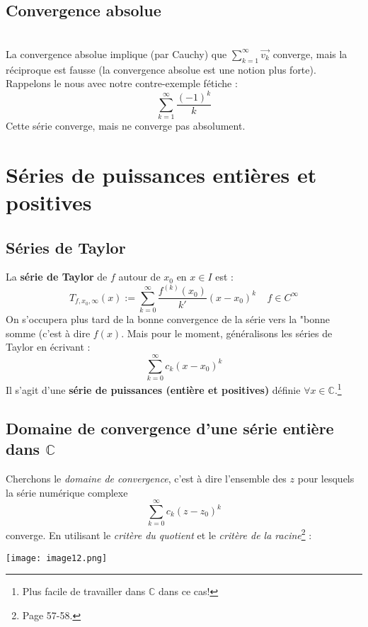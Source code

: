 \documentclass[british,french,11pt, a4paper, openany]{book}
\newcommand{\serie}{\sum_{k=1}^\infty}
\newcommand{\series}{\sum_{k=0}^\infty}
\begin{document}
\subsection{Convergence absolue}
\proposition{$\serie \vec{v_k}$ C.A. $\Leftrightarrow\ \serie ||\vec{v_k}||$ converge.}\ \\
La convergence absolue implique (par Cauchy) que $\serie\vec{v_k}$ converge, mais la réciproque est fausse (la convergence absolue est une notion plus forte). Rappelons le nous avec notre contre-exemple fétiche :
\begin{equation}
	\serie \frac{(-1)^k}{k}
\end{equation}
Cette série converge, mais ne converge pas absolument.
					
\section{Séries de puissances entières et positives}
\subsection{Séries de Taylor}
La \textbf{série de Taylor} de $f$ autour de $x_0$ en $x\in I$ est :
\begin{equation}
	T_{f,x_0,\infty}(x) := \series \frac{f^{(k)}(x_0)}{k'}(x-x_0)^k\ \ \ \ \ f \in C^\infty
\end{equation}
On s'occupera plus tard de la bonne convergence de la série vers la "bonne somme (c'est à dire $f(x)$. Mais pour le moment, généralisons les séries  de Taylor en écrivant :
\begin{equation}
	\series c_k(x-x_0)^k
\end{equation}
Il s'agit d'une \textbf{série de puissances (entière et positives)} définie $\forall x \in \mathbb{C}$.\footnote{Plus facile de travailler dans $\mathbb{C}$ dans ce cas!}
					
\subsection{Domaine de convergence d'une série entière dans $\mathbb{C}$}
Cherchons le \textit{domaine de convergence}, c'est à dire l'ensemble des $z$ pour lesquels la série numérique complexe
\begin{equation}
	\series c_k(z-z_0)^k
\end{equation}
converge.
En utilisant le \textit{critère du quotient} et le \textit{critère de la racine}\footnote{Page 57-58.} :
\begin{center}
	\texttt{[image: image12.png]}
\end{center}
					
\end{document}
